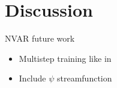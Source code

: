 \section{Discussion}
\label{sec:discussion}


NVAR future work
\begin{itemize}
    \item Multistep training like in \citep{weyn_improving_2020}
    \item Include $\psi$ streamfunction
\end{itemize}
